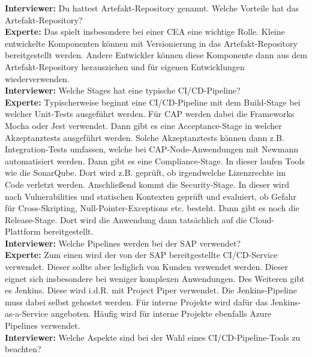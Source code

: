 \begin{linenumbers}
\textbf{Interviewer:} Du hattest Artefakt-Repository genannt. Welche Vorteile hat das Artefakt-Repository?\\
\textbf{Experte:} Das spielt insbesondere bei einer CEA eine wichtige Rolle. Kleine entwickelte Komponenten können mit Versionierung in das Artefakt-Repository bereitgestellt werden. Andere Entwickler können diese Komponente dann aus dem Artefakt-Repository herausziehen und für eigenen Entwicklungen wiederverwenden.\\
\textbf{Interviewer:} Welche Stages hat eine typische CI/CD-Pipeline?\\ 
\textbf{Experte:} Typischerweise beginnt eine CI/CD-Pipeline mit dem Build-Stage bei welcher Unit-Tests ausgeführt werden. Für CAP werden dabei die Frameworks Mocha oder Jest verwendet. Dann gibt es eine Acceptance-Stage in welcher Akzeptanztests ausgeführt werden. Solche Akzeptanztests können dann z.B. Integration-Tests umfassen, welche bei CAP-Node-Anwendungen mit Newmann automatisiert werden. Dann gibt es eine Compliance-Stage. In dieser laufen Tools wie die SonarQube. Dort wird z.B. geprüft, ob irgendwelche Lizenzrechte im Code verletzt werden. Anschließend kommt die Security-Stage. In dieser wird nach Vulnerabilities und statischen Kontexten geprüft und evaluiert, ob Gefahr für Cross-Skripting, Null-Pointer-Exceptions etc. besteht. Dann gibt es noch die Release-Stage. Dort wird die Anwendung dann tatsächlich auf die Cloud-Plattform bereitgestellt.\\
\textbf{Interviewer:} Welche Pipelines werden bei der SAP verwendet?\\
\textbf{Experte:} Zum einen wird der von der SAP bereitgestellte CI/CD-Service verwendet. Dieser sollte aber lediglich von Kunden verwendet werden. Dieser eignet sich insbesondere bei weniger komplexen Anwendungen. Des Weiteren gibt es Jenkins. Diese wird i.d.R. mit Project Piper verwendet. Die Jenkins-Pipeline muss dabei selbst gehostet werden. Für interne Projekte wird dafür das Jenkins-as-a-Service angeboten. Häufig wird für interne Projekte ebenfalls Azure Pipelines verwendet.\\
\textbf{Interviewer:} Welche Aspekte sind bei der Wahl eines CI/CD-Pipeline-Tools zu beachten?\\

\end{linenumbers}
